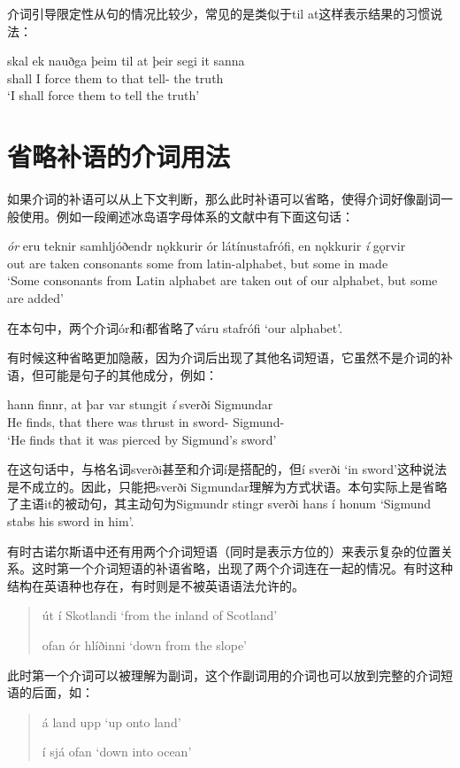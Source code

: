 介词引导限定性从句的情况比较少，常见的是类似于til at这样表示结果的习惯说法：
\begin{exe}
    \ex \gll
    skal ek nauðga þeim til at þeir segi it sanna\\
    shall I force them to that tell-{\sub} the truth\\
    \trans `I shall force them to tell the truth'
\end{exe}

\section{省略补语的介词用法}
如果介词的补语可以从上下文判断，那么此时补语可以省略，使得介词好像副词一般使用。例如一段阐述冰岛语字母体系的文献中有下面这句话：
\begin{exe}
    \ex \gll
    \textit{ór} eru teknir samhljóðendr nǫkkurir ór látínustafrófi, en nǫkkurir \textit{í} gǫrvir\\
    out are taken consonants some from latin-alphabet, but some in made\\
    \trans `Some consonants from Latin alphabet are taken out of our alphabet, but some are added'
\end{exe}

在本句中，两个介词ór和í都省略了váru stafrófi `our alphabet'.

有时候这种省略更加隐蔽，因为介词后出现了其他名词短语，它虽然不是介词的补语，但可能是句子的其他成分，例如：
\begin{exe}
    \ex \gll
    hann finnr, at þar var stungit \textit{í} sverði Sigmundar\\
    He finds, that there was thrust in sword-{\dat} Sigmund-{\gen}\\
    \trans `He finds that it was pierced by Sigmund's sword'
\end{exe}

在这句话中，与格名词sverði甚至和介词í是搭配的，但í sverði `in sword'这种说法是不成立的。因此，只能把sverði Sigmundar理解为方式状语。本句实际上是省略了主语it的被动句，其主动句为Sigmundr stingr sverði hans í honum `Sigmund stabs his sword in him'.

有时古诺尔斯语中还有用两个介词短语（同时是表示方位的）来表示复杂的位置关系。这时第一个介词短语的补语省略，出现了两个介词连在一起的情况。有时这种结构在英语种也存在，有时则是不被英语语法允许的。
\begin{quote}
    út í Skotlandi `from the inland of Scotland'

    ofan ór hlíðinni `down from the slope'
\end{quote}

此时第一个介词可以被理解为副词，这个作副词用的介词也可以放到完整的介词短语的后面，如：
\begin{quote}
    á land upp `up onto land'

    í sjá ofan `down into ocean'
\end{quote}



